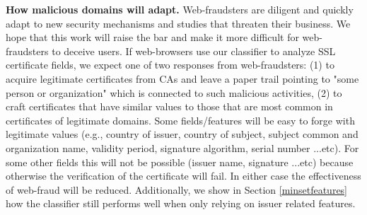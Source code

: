 \documentclass[twocolumn]{article}
\newcommand{\descr}[1]{\bigskip \noindent \textbf{#1}}
\begin{document}
\descr{How malicious domains will adapt.} 
Web-fraudsters are diligent and quickly adapt to new security
mechanisms and studies that threaten their business. We hope that this work will raise 
the bar and make it more difficult for web-fraudsters to deceive users.  
If web-browsers use our
classifier to analyze SSL certificate fields, we expect
one of two responses from web-fraudsters:
(1) to acquire legitimate certificates from CAs and leave a paper trail pointing to
"some person or organization" which is connected to such malicious activities, (2) to craft
certificates that have similar values to those that are most common in certificates 
of legitimate domains. Some fields/features will be easy to forge with legitimate values
(e.g., country of issuer, country of subject, subject common and organization name, validity period,
signature algorithm, serial number ...etc). For some other fields this will not be possible
(issuer name, signature ...etc) because otherwise the verification of
the certificate will fail. In either case the effectiveness of web-fraud will be reduced. Additionally, we show in Section \ref{minsetfeatures} how the classifier still performs well when only relying on issuer related features. 
\end{document}
